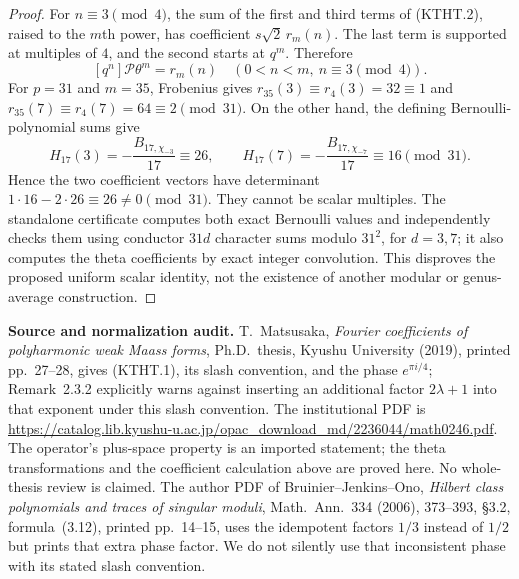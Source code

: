 \documentclass[11pt,a4paper]{article}
\theoremstyle{definition}
\renewcommand{\paragraph}[1]{\par\smallskip\noindent\textbf{#1}\quad\ignorespaces}
\begin{document}
\begin{proof}
For $n\equiv3\pmod4$, the sum of the first and third
terms of (KTHT.2), raised to the $m$th power, has coefficient
$s\sqrt2\,r_m(n)$.  The last term is supported at multiples
of $4$, and the second starts at $q^m$.  Therefore
\[
 [q^n]\mathcal P\theta^m=r_m(n)
 \quad(0<n<m,\ n\equiv3\pmod4).                        \tag{KTHT.3}
\]
For $p=31$ and $m=35$, Frobenius gives
$r_{35}(3)\equiv r_4(3)=32\equiv1$ and
$r_{35}(7)\equiv r_4(7)=64\equiv2\pmod{31}$.
On the other hand, the defining Bernoulli-polynomial sums give
\[
 H_{17}(3)=-\frac{B_{17,\chi_{-3}}}{17}\equiv26,
 \qquad
 H_{17}(7)=-\frac{B_{17,\chi_{-7}}}{17}\equiv16
 \pmod{31}.
\]
Hence the two coefficient vectors have determinant
$1\cdot16-2\cdot26\equiv26\ne0\pmod{31}$.
They cannot be scalar multiples.  The standalone certificate
 computes both exact
Bernoulli values and independently checks them using conductor
$31d$ character sums modulo $31^2$, for $d=3,7$; it also
computes the theta coefficients by exact integer convolution.
This disproves the proposed uniform scalar identity, not the
existence of another modular or genus-average construction.
\end{proof}

\paragraph{Source and normalization audit.}
T.~Matsusaka, \emph{Fourier coefficients of polyharmonic weak
Maass forms}, Ph.D.~thesis, Kyushu University (2019), printed
pp.~27--28, gives (KTHT.1), its slash convention, and the
phase $e^{\pi i/4}$; Remark~2.3.2 explicitly warns against
inserting an additional factor $2\lambda+1$ into that exponent
under this slash convention.  The institutional PDF is
\url{https://catalog.lib.kyushu-u.ac.jp/opac_download_md/2236044/math0246.pdf}.
The operator's plus-space property is an imported statement;
the theta transformations and the coefficient calculation above
are proved here.  No whole-thesis review is claimed.
The author PDF of Bruinier--Jenkins--Ono,
\emph{Hilbert class polynomials and traces of singular moduli},
Math.~Ann.~334 (2006), 373--393, \S3.2, formula~(3.12),
printed pp.~14--15, uses the idempotent factors $1/3$ instead of
$1/2$ but prints that extra phase factor.  We do not silently
use that inconsistent phase with its stated slash convention.



\end{document}
